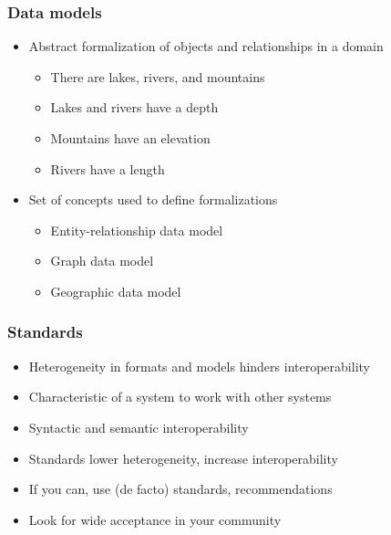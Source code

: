\documentclass{beamer}
\begin{document}
\begin{frame}
  \frametitle{Data models}
  
  \begin{itemize}
  \item Abstract formalization of objects and relationships in a domain
  \begin{itemize}
    \item There are lakes, rivers, and mountains
    \item Lakes and rivers have a depth
    \item Mountains have an elevation
    \item Rivers have a length
  \end{itemize}
  \item Set of concepts used to define formalizations
  \begin{itemize}
    \item Entity-relationship data model
    \item Graph data model
    \item Geographic data model
  \end{itemize}
  \end{itemize}
\end{frame}

\begin{frame}
  \frametitle{Standards}
  
  \begin{itemize}
  \item Heterogeneity in formats and models hinders interoperability
  \item Characteristic of a system to work with other systems
  \item Syntactic and semantic interoperability
  \item Standards lower heterogeneity, increase interoperability
  \item If you can, use (de facto) standards, recommendations
  \item Look for wide acceptance in your community
  \end{itemize}
\end{frame}
\end{document}
